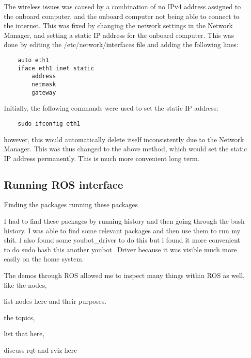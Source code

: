 \documentclass[a4paper, 12pt]{article}
\newif\ifshownotes
\newcommand{\notes}[1]{\ifshownotes\textcolor{blue}{#1}\fi}
\begin{document}
    The wireless issues was caused by a combination of no IPv4 address assigned to the onboard computer, and the onboard computer not being able to connect to the internet. This was fixed by changing the network settings in the Network Manager, and setting a static IP address for the onboard computer. This was done by editing the /etc/network/interfaces file and adding the following lines:

    \begin{verbatim}
    auto eth1
    iface eth1 inet static
        address
        netmask
        gateway
    \end{verbatim}

    Initially, the following commands were used to set the static IP address: 
    \begin{verbatim}
    sudo ifconfig eth1
    \end{verbatim}
    however, this would automatically delete itself inconsistently due to the Network Manager. This was thus changed to the above method, which would set the static IP address permanently. This is much more convenient long term. 


    \pagebreak


    \subsection{Running ROS interface}

    \notes{
        so what packages were there?
    }

    \notes{describe the process of inspecting the installed software, the drivers and wrappers, and running the original demos.}
     \notes{rqt, rviz, the various topics and nodes, etc. }
    Finding the packages
    running these packages

    I had to find these packages by running history and then going through the bash history. I was able to find some relevant packages and then use them to run my shit. I also found some youbot\_driver to do this but i found it more convenient to do sudo bash this another youbot\_Driver because it was visible much more easily on the home system. 

    The demos through ROS allowed me to inspect many things within ROS as well, like the nodes,

    list nodes here and their purposes.

    the topics,

    list that here,

    discuss rqt and rviz here
\end{document}
